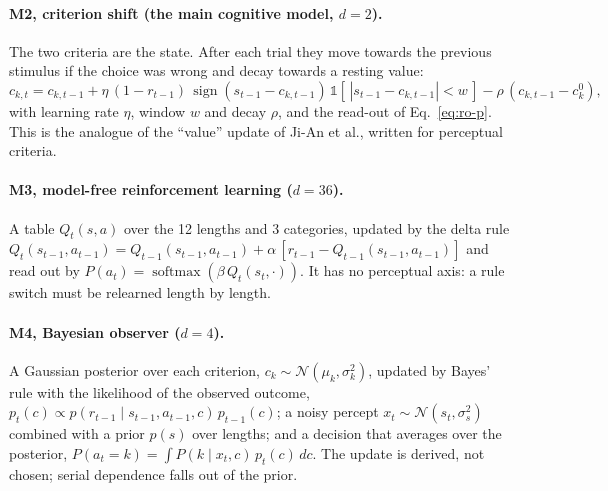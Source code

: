 \documentclass[11pt,a4paper]{article}
\begin{document}
\paragraph{M2, criterion shift (the main cognitive model, $d=2$).} The two criteria are
the state. After each trial they move towards the previous stimulus if the choice was
wrong and decay towards a resting value:
\begin{equation}
  c_{k,t} = c_{k,t-1} + \eta\,(1 - r_{t-1})\,\operatorname{sign}(s_{t-1} - c_{k,t-1})\,
            \mathbb{1}\!\left[\,|s_{t-1} - c_{k,t-1}| < w\,\right]
            - \rho\,(c_{k,t-1} - c_k^{0}),
  \label{eq:m2}
\end{equation}
with learning rate $\eta$, window $w$ and decay $\rho$, and the read-out of
Eq.~\eqref{eq:ro-p}. This is the analogue of the ``value'' update of Ji-An et al.,
written for perceptual criteria.

\paragraph{M3, model-free reinforcement learning ($d = 36$).} A table
$Q_t(s, a)$ over the 12 lengths and 3 categories, updated by the delta rule
$Q_t(s_{t-1}, a_{t-1}) = Q_{t-1}(s_{t-1}, a_{t-1}) + \alpha\,[r_{t-1} - Q_{t-1}(s_{t-1}, a_{t-1})]$
and read out by $P(a_t) = \operatorname{softmax}(\beta\, Q_t(s_t, \cdot))$. It has no
perceptual axis: a rule switch must be relearned length by length.

\paragraph{M4, Bayesian observer ($d = 4$).} A Gaussian posterior over each criterion,
$c_k \sim \mathcal{N}(\mu_k, \sigma_k^2)$, updated by Bayes' rule with the likelihood
of the observed outcome, $p_t(c) \propto p(r_{t-1} \mid s_{t-1}, a_{t-1}, c)\,p_{t-1}(c)$;
a noisy percept $x_t \sim \mathcal{N}(s_t, \sigma_s^2)$ combined with a prior $p(s)$
over lengths; and a decision that averages over the posterior,
$P(a_t = k) = \int P(k \mid x_t, c)\,p_t(c)\,dc$. The update is derived, not chosen;
serial dependence falls out of the prior.
\end{document}

